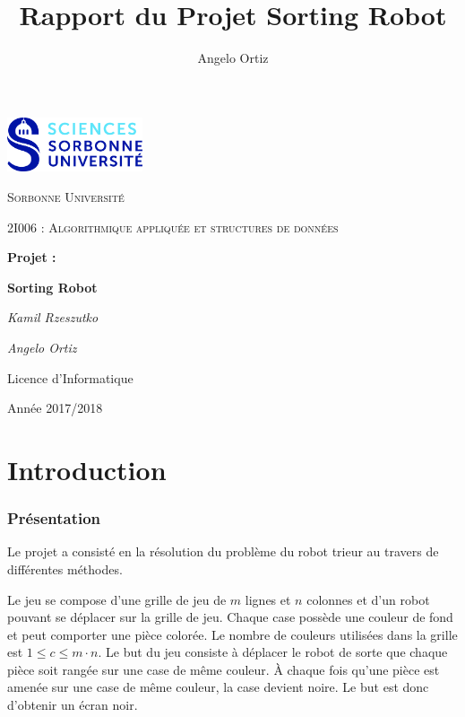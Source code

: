 \documentclass[12pt,a4paper]{article}
\author{Angelo Ortiz}
\title{Rapport du Projet Sorting Robot}
\begin{document}
\begin{titlepage}
  \centering
  \includegraphics[width=0.30\textwidth]{logo}\par\vspace{1cm}
  {\scshape\LARGE Sorbonne Universit\'e\par}
  \vspace{1cm}
  {\scshape\Large 2I006 : Algorithmique appliqu\'ee et structures de 
donn\'ees\par}
  \vspace{1.5cm}
  {\Large \bfseries Projet :\par}
  {\huge\bfseries Sorting Robot\par}
  \vspace{2cm}
  {\Large\itshape Kamil Rzeszutko\par}
  {\Large\itshape Angelo Ortiz\par}
  \vfill
  
  {\large Licence d'Informatique\par}
  {\large Ann\'ee 2017/2018\par}
\end{titlepage}
 
\tableofcontents
\listoffigures

\newpage
  
\part*{Introduction}
\section*{Pr\'esentation}
Le projet a consist\'e en la r\'esolution du probl\`eme du robot 
trieur au travers de diff\'erentes m\'ethodes.

Le jeu se compose d'une grille de jeu de $m$ lignes et $n$ colonnes et d'un 
robot pouvant se d\'eplacer sur la grille de jeu. Chaque case poss\`ede une 
couleur de fond et peut comporter une pi\`ece color\'ee. Le nombre de couleurs 
utilis\'ees dans la grille est $1 \leq c \leq m \cdot n$. Le but du jeu 
consiste \`a d\'eplacer le robot de sorte que chaque pi\`ece soit rang\'ee sur 
une case de m\^eme couleur. \`A chaque fois qu'une pi\`ece est amen\'ee sur une 
case de m\^eme couleur, la case devient noire. Le but est donc d'obtenir un 
\'ecran noir.
\end{document}
